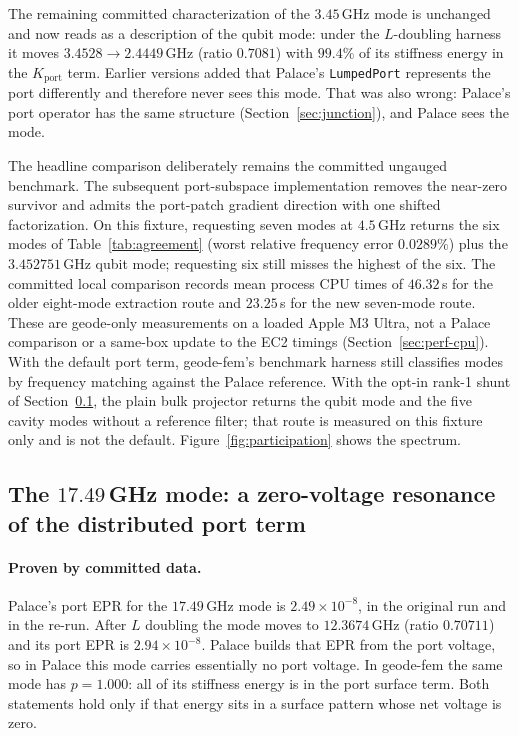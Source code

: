 \documentclass{anvil-paper}
\begin{document}
The remaining committed characterization of the $3.45$\,GHz mode is
unchanged and now reads as a description of the qubit mode: under the
$L$-doubling harness it moves $3.4528 \to 2.4449$\,GHz (ratio $0.7081$)
with $99.4\%$ of its stiffness energy in the $K_{\mathrm{port}}$ term.
Earlier versions added that Palace's \texttt{LumpedPort} represents the
port differently and therefore never sees this mode. That was also
wrong: Palace's port operator has the same structure
(Section~\ref{sec:junction}), and Palace sees the mode.

The headline comparison deliberately remains the committed ungauged
benchmark. The subsequent port-subspace implementation removes the
near-zero survivor and admits the port-patch gradient direction with one shifted
factorization. On this fixture, requesting seven modes at $4.5$\,GHz
returns the six modes of Table~\ref{tab:agreement} (worst relative
frequency error $0.0289\%$) plus the $3.452751$\,GHz qubit mode;
requesting six still misses the highest of the six. The committed local
comparison records mean process CPU times of $46.32$\,s for the older
eight-mode extraction route and $23.25$\,s for the new seven-mode route.
These are geode-only measurements on a loaded Apple M3 Ultra, not a
Palace comparison or a same-box update to the EC2 timings
(Section~\ref{sec:perf-cpu}). With the default port term, geode-fem's
benchmark harness still classifies modes by frequency matching against
the Palace reference. With the opt-in rank-1 shunt of
Section~\ref{sec:port-artifact}, the plain bulk projector returns the
qubit mode and the five cavity modes without a reference filter; that
route is measured on this fixture only and is not the default.
Figure~\ref{fig:participation} shows the spectrum.

\subsection{The \texorpdfstring{$17.49$\,GHz}{17.49 GHz} mode: a zero-voltage resonance of the distributed port term}
\label{sec:port-artifact}

\paragraph{Proven by committed data.}
Palace's port EPR for the $17.49$\,GHz mode is $2.49\times10^{-8}$, in
the original run and in the re-run. After $L$ doubling the mode moves to
$12.3674$\,GHz (ratio $0.70711$) and its port EPR is
$2.94\times10^{-8}$. Palace builds that EPR from the port voltage, so in
Palace this mode carries essentially no port voltage. In geode-fem the
same mode has $p = 1.000$: all of its stiffness energy is in the port
surface term. Both statements hold only if that energy sits in a
surface pattern whose net voltage is zero.
\end{document}
